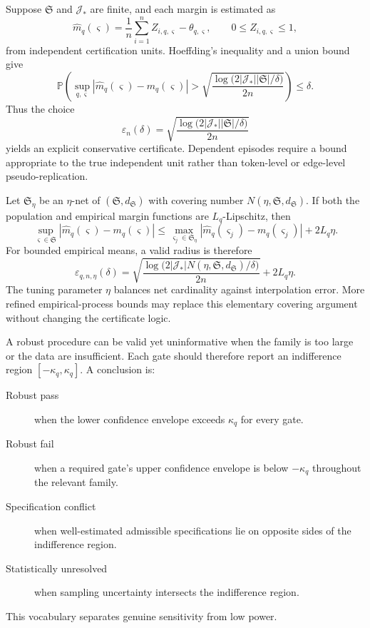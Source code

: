 
Suppose \(\mathfrak S\) and \(\mathcal J_*\) are finite, and each margin is
estimated as
\[
\widehat m_q(\varsigma)
=
\frac1n\sum_{i=1}^nZ_{i,q,\varsigma}-\theta_{q,\varsigma},
\qquad
0\leq Z_{i,q,\varsigma}\leq1,
\]
from independent certification units. Hoeffding's inequality and a union bound
give
\[
\mathbb P\left(
\sup_{q,\varsigma}
\left|
\widehat m_q(\varsigma)-m_q(\varsigma)
\right|
>
\sqrt{
\frac{
\log\bigl(2|\mathcal J_*||\mathfrak S|/\delta\bigr)
}{2n}}
\right)
\leq\delta.
\]
Thus the choice
\[
\boxed{
\varepsilon_n(\delta)
=
\sqrt{
\frac{
\log\bigl(2|\mathcal J_*||\mathfrak S|/\delta\bigr)
}{2n}
}
}
\]
yields an explicit conservative certificate. Dependent episodes require a
bound appropriate to the true independent unit rather than token-level or
edge-level pseudo-replication.


Let \(\mathfrak S_\eta\) be an \(\eta\)-net of
\((\mathfrak S,d_{\mathfrak S})\) with covering number
\(N(\eta,\mathfrak S,d_{\mathfrak S})\). If both the population and empirical
margin functions are \(L_q\)-Lipschitz, then
\[
\sup_{\varsigma\in\mathfrak S}
|\widehat m_q(\varsigma)-m_q(\varsigma)|
\leq
\max_{\varsigma_j\in\mathfrak S_\eta}
|\widehat m_q(\varsigma_j)-m_q(\varsigma_j)|
+2L_q\eta.
\]
For bounded empirical means, a valid radius is therefore
\[
\boxed{
\varepsilon_{q,n,\eta}(\delta)
=
\sqrt{
\frac{
\log\bigl(2|\mathcal J_*|
N(\eta,\mathfrak S,d_{\mathfrak S})/\delta\bigr)
}{2n}
}
+2L_q\eta.
}
\]
The tuning parameter \(\eta\) balances net cardinality against interpolation
error. More refined empirical-process bounds may replace this elementary
covering argument without changing the certificate logic.


A robust procedure can be valid yet uninformative when the family is too large
or the data are insufficient. Each gate should therefore report an
indifference region \([-\kappa_q,\kappa_q]\). A conclusion is:
\begin{description}
\item[Robust pass] when the lower confidence envelope exceeds
 \(\kappa_q\) for every gate.
\item[Robust fail] when a required gate's upper confidence envelope is below
 \(-\kappa_q\) throughout the relevant family.
\item[Specification conflict] when well-estimated admissible specifications
 lie on opposite sides of the indifference region.
\item[Statistically unresolved] when sampling uncertainty intersects the
 indifference region.
\end{description}
This vocabulary separates genuine sensitivity from low power.

